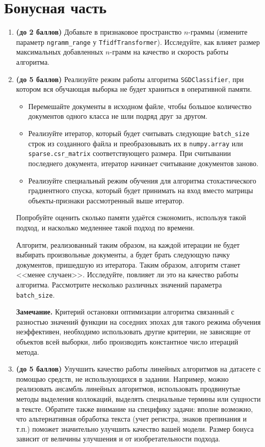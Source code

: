 \documentclass[10pt,fleqn]{article}
\begin{document}
\section*{Бонусная часть}

\begin{enumerate}
\item \textbf{(до 2 баллов)} Добавьте в признаковое пространство $n$-граммы (измените параметр \texttt{ngramm\_range} у \texttt{TfidfTransformer}). Исследуйте, как влияет размер максимальных добавленных $n$-грамм на качество и скорость работы алгоритма.

\item \textbf{(до 5 баллов)} Реализуйте режим работы алгоритма \texttt{SGDClassifier}, при котором вся обучающая выборка не будет храниться в оперативной памяти.

\begin{itemize}
    \item Перемешайте документы в исходном файле, чтобы большое количество документов одного класса не шли подряд друг за другом.
    \item Реализуйте итератор, который будет считывать следующие \texttt{batch\_size} строк из созданного файла и преобразовывать их в \texttt{numpy.array} или \texttt{sparse.csr\_matrix} соответствующего размера. При считывании последнего документа, итератор начинает считывание документов заново.
    \item Реализуйте специальный режим обучения для алгоритма стохастического градиентного спуска, который будет принимать на вход вместо матрицы объекты-признаки рассмотренный выше итератор.
\end{itemize}

Попробуйте оценить сколько памяти удаётся сэкономить, используя такой подход, и насколько медленнее такой подход по времени.

Алгоритм, реализованный таким образом, на каждой итерации не будет выбирать произвольные документы, а будет брать следующую пачку документов, пришедшую из итератора. Таким образом, алгоритм станет <<менее случаен>>. Исследуйте, повлияет ли это на качество работы алгоритма. Рассмотрите несколько различных значений параметра \texttt{batch\_size}.

\textbf{Замечание.} Критерий остановки оптимизации алгоритма связанный с разностью значений функции на соседних эпохах для такого режима обучения неэффективен, необходимо использовать другие критерии, не зависящие от объектов всей выборки, либо производить константное число итераций метода.

\item \textbf{(до 5 баллов)} Улучшить качество работы линейных алгоритмов на датасете с помощью средств, не использующихся в задании. Например, можно реализовать ансамбль линейных алгоритмов, использовать продвинутые методы выделения коллокаций, выделять специальные термины или сущности в тексте. Обратите также внимание на специфику задачи: вполне возможно, что альтернативная обработка текста (учет регистра, знаков препинания и т.п.) поможет значительно улучшить качество вашей модели. Размер бонуса зависит от величины улучшения и от изобретательности подхода.

\end{enumerate}
\end{document}
